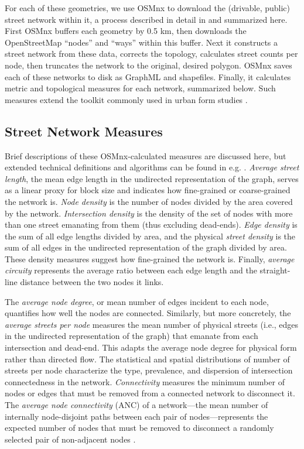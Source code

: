 \documentclass[Afour,sageh,times]{sagej}
\renewcommand{\cite}{\citep}
\begin{document}
For each of these geometries, we use OSMnx to download the (drivable, public) street network within it, a process described in detail in \cite{redacted_osmnx:_2017} and summarized here. First OSMnx buffers each geometry by 0.5 km, then downloads the OpenStreetMap \enquote{nodes} and \enquote{ways} within this buffer. Next it constructs a street network from these data, corrects the topology, calculates street counts per node, then truncates the network to the original, desired polygon. OSMnx saves each of these networks to disk as GraphML and shapefiles. Finally, it calculates metric and topological measures for each network, summarized below. Such measures extend the toolkit commonly used in urban form studies \cite{talen_measuring_2003, ewing_travel_2010}.

\subsection{Street Network Measures}

Brief descriptions of these OSMnx-calculated measures are discussed here, but extended technical definitions and algorithms can be found in e.g. \cite{trudeau_introduction_1994, albert_statistical_2002, dorogovtsev_evolution_2002, brandes_network_2005, costa_characterization_2007, newman_structure_2003, newman_networks:_2010, barthelemy_spatial_2011, cranmer_navigating_2017}. \emph{Average street length}, the mean edge length in the undirected representation of the graph, serves as a linear proxy for block size and indicates how fine-grained or coarse-grained the network is. \emph{Node density} is the number of nodes divided by the area covered by the network. \emph{Intersection density} is the density of the set of nodes with more than one street emanating from them (thus excluding dead-ends). \emph{Edge density} is the sum of all edge lengths divided by area, and the physical \emph{street density} is the sum of all edges in the undirected representation of the graph divided by area. These density measures suggest how fine-grained the network is. Finally, \emph{average circuity} represents the average ratio between each edge length and the straight-line distance between the two nodes it links.

The \emph{average node degree}, or mean number of edges incident to each node, quantifies how well the nodes are connected. Similarly, but more concretely, the \emph{average streets per node} measures the mean number of physical streets (i.e., edges in the undirected representation of the graph) that emanate from each intersection and dead-end. This adapts the average node degree for physical form rather than directed flow. The statistical and spatial distributions of number of streets per node characterize the type, prevalence, and dispersion of intersection connectedness in the network. \emph{Connectivity} measures the minimum number of nodes or edges that must be removed from a connected network to disconnect it. The \emph{average node connectivity} (ANC) of a network---the mean number of internally node-disjoint paths between each pair of nodes---represents the expected number of nodes that must be removed to disconnect a randomly selected pair of non-adjacent nodes \cite{beineke_average_2002,dankelmann_bounds_2003}. 
\end{document}
